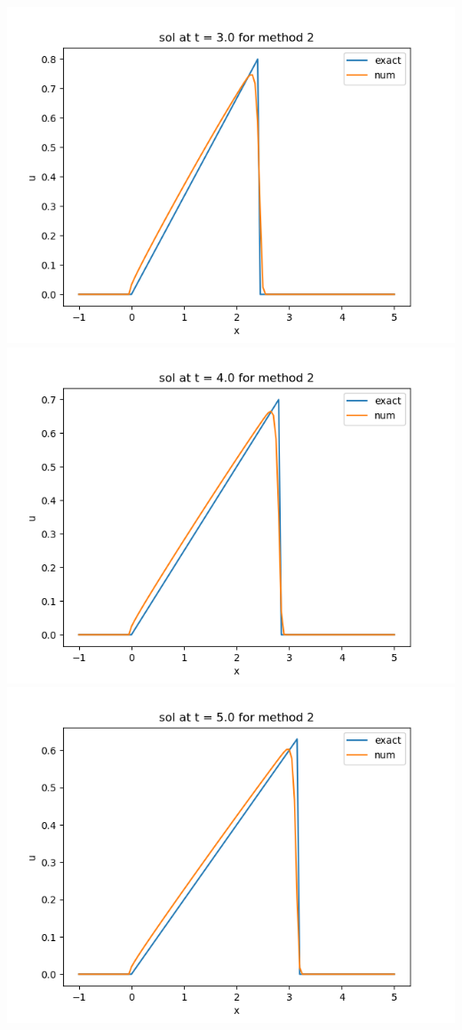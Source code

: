 \documentclass{article}
\begin{document}
\begin{enumerate}
\begin{center}
	\includegraphics[scale=.23]{hw13 sol t = 3 method 2}
	\includegraphics[scale=.3]{hw13 sol t = 4 method 2}
	\includegraphics[scale=.3]{hw13 sol t = 5 method 2}

\end{center}
\end{enumerate}
\end{document}
